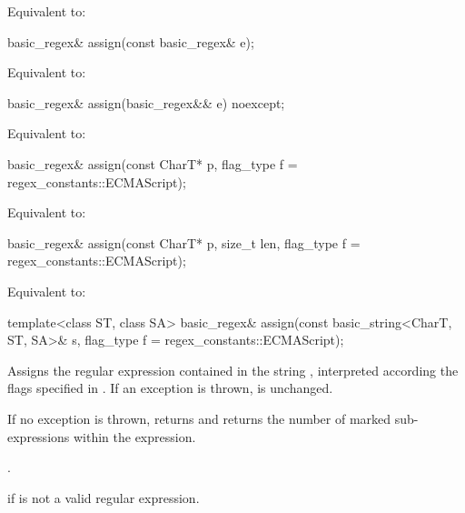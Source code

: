 \begin{itemdescr}
\pnum
\effects
Equivalent to: 
\end{itemdescr}

%
\begin{itemdecl}
basic_regex& assign(const basic_regex& e);
\end{itemdecl}

\begin{itemdescr}
\pnum
\effects
Equivalent to: 
\end{itemdescr}

%
\begin{itemdecl}
basic_regex& assign(basic_regex&& e) noexcept;
\end{itemdecl}

\begin{itemdescr}
\pnum
\effects
Equivalent to: 
\end{itemdescr}

%
\begin{itemdecl}
basic_regex& assign(const CharT* p, flag_type f = regex_constants::ECMAScript);
\end{itemdecl}

\begin{itemdescr}
\pnum
\effects
Equivalent to: 
\end{itemdescr}

%
\begin{itemdecl}
basic_regex& assign(const CharT* p, size_t len, flag_type f = regex_constants::ECMAScript);
\end{itemdecl}

\begin{itemdescr}
\pnum
\effects
Equivalent to: 
\end{itemdescr}

%
\begin{itemdecl}
template<class ST, class SA>
  basic_regex& assign(const basic_string<CharT, ST, SA>& s,
                      flag_type f = regex_constants::ECMAScript);
\end{itemdecl}

\begin{itemdescr}
\pnum
\effects
Assigns the regular expression contained in the string
, interpreted according the flags specified in .
If an exception is thrown,  is unchanged.

\pnum
\ensures
If no exception is thrown,
 returns  and 
returns the number of marked sub-expressions within the expression.

\pnum
\returns
{}.

\pnum
\throws
{} if  is not a valid regular expression.
\end{itemdescr}

